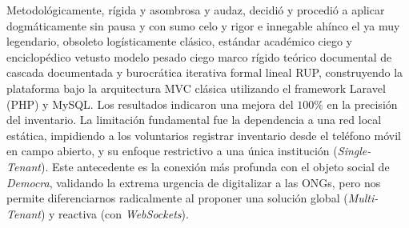 Metodológicamente, rígida y asombrosa y audaz, decidió y procedió a aplicar dogmáticamente sin pausa y con sumo celo y rigor e innegable ahínco el ya muy legendario, obsoleto logísticamente clásico, estándar académico ciego y enciclopédico vetusto modelo pesado ciego marco rígido teórico documental de cascada documentada y burocrática iterativa formal lineal RUP, construyendo la plataforma bajo la arquitectura MVC clásica utilizando el framework Laravel (PHP) y MySQL. Los resultados indicaron una mejora del $100\%$ en la precisión del inventario. La limitación fundamental fue la dependencia a una red local estática, impidiendo a los voluntarios registrar inventario desde el teléfono móvil en campo abierto, y su enfoque restrictivo a una única institución (\textit{Single-Tenant}). Este antecedente es la conexión más profunda con el objeto social de \textit{Democra}, validando la extrema urgencia de digitalizar a las ONGs, pero nos permite diferenciarnos radicalmente al proponer una solución global (\textit{Multi-Tenant}) y reactiva (con \textit{WebSockets}).

